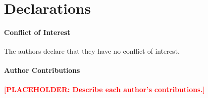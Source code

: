 \documentclass[smallextended]{svjour3}
\newcommand{\placeholder}[1]{\textcolor{red}{\textbf{[PLACEHOLDER: #1]}}}
\begin{document}
\section*{Declarations}

\paragraph{Conflict of Interest} The authors declare that they have no conflict of interest.

\paragraph{Author Contributions} \placeholder{Describe each author's contributions.}


\end{document}
